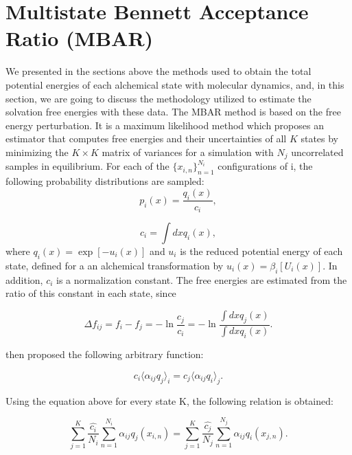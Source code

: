 \section{Multistate Bennett Acceptance Ratio (MBAR)}\label{mbar}

We presented in the sections above the methods used to obtain the total potential energies of each alchemical state with molecular dynamics, and, in this section, we are going to discuss the methodology utilized to estimate the solvation free energies with these data. The MBAR method \cite{mbar} is based on the free energy perturbation. It is a maximum likelihood method which proposes an estimator that computes free energies and their uncertainties of all $K$ states by minimizing the $K \times K$ matrix of variances for a simulation with $N_{j}$ uncorrelated samples in equilibrium. For each of the $\lbrace x_{i,n } \rbrace ^{N_{i}}_{n=1 }$ configurations of i, the following probability distributions are sampled:
\begin{equation}
p_{i}(x) = \frac{q_{i}(x)}{c_{i}},
\end{equation}

\begin{equation}
c_{i} = \int dx q_{i}(x),
\end{equation}
where $q_{i}(x)=\exp[-u_{i}(x)]$ and $u_{i}$ is the reduced potential energy of each state, defined for a an alchemical transformation by $u_{i} (x)= \beta_{i} [U_{i}(x)]$. In addition, $c_{i}$ is a normalization constant.  The free energies are estimated from the ratio of this constant in each state, since

\begin{equation}
\Delta f_{ij} = f_{i} - f_{j} = - \ln \frac{c_{j}}{c_{i}}  = -\ln \frac{\int dx q_{j}(x)}{\int dx q_{i}(x)} .
\label{eqn:mbar1}
\end{equation}

 then proposed the following arbitrary function:

\begin{equation}
c_{i} \langle \alpha _{ij} q_{j} \rangle _{i}  =  c_{j} \langle \alpha _{ij} q_{i} \rangle _{j} .
\end{equation}

Using the equation above for every state  K, the following relation is obtained:

\begin{equation}
\label{eq:mbar1}
\sum_{j=1}^{K} \frac{\hat{c_{i}}}{N_{i}} \sum_{n=1}^{N_{i}} \alpha _{ij} q_{j} (x_{i,n}) =  \sum_{j=1}^{K} \frac{\hat{c_{j}}}{N_{j}} \sum_{n=1}^{N_{j}} \alpha _{ij} q_{i} (x_{j,n}) .
\end{equation}

